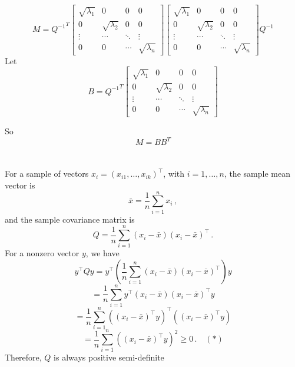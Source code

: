 \documentclass{article}
\begin{document}
\begin{itemize}
        \[
            M = {Q^{-1}}^{T}
            \begin{bmatrix}
                \sqrt{\lambda_1} & 0 & 0 & 0 \\
                0 & \sqrt{\lambda_2} & 0 & 0 \\
                \vdots & \cdots & \ddots & \vdots \\
                0 & 0 & \cdots & \sqrt{\lambda_n}
            \end{bmatrix}
            \begin{bmatrix}
                \sqrt{\lambda_1} & 0 & 0 & 0 \\
                0 & \sqrt{\lambda_2} & 0 & 0 \\
                \vdots & \cdots & \ddots & \vdots \\
                0 & 0 & \cdots & \sqrt{\lambda_n}
            \end{bmatrix}
            Q^{-1}
        \]
        Let
        \[
            B = {Q^{-1}}^{T}
            \begin{bmatrix}
                \sqrt{\lambda_1} & 0 & 0 & 0 \\
                0 & \sqrt{\lambda_2} & 0 & 0 \\
                \vdots & \cdots & \ddots & \vdots \\
                0 & 0 & \cdots & \sqrt{\lambda_n}
            \end{bmatrix}
        \]

        So
        \[
            M=BB^{T}
        \]


\end{itemize}

\section{}
For a sample of vectors $x_i=(x_{i1},\dots,x_{ik})^\top$, with $i=1,\dots,n$, the sample mean vector is
\[ \bar{x}=\frac{1}{n} \sum_{i=1}^n x_i \, , \]
and the sample covariance matrix is
\[ Q = \frac{1}{n} \sum_{i=1}^n (x_i-\bar{x})(x_i-\bar{x})^\top \, .  \]
For a nonzero vector $y$, we have
\[ y^\top Qy = y^\top\left(\frac{1}{n} \sum_{i=1}^n (x_i-\bar{x})(x_i-\bar{x})^\top\right) y \]
\[ = \frac{1}{n} \sum_{i=1}^n y^\top (x_i-\bar{x})(x_i-\bar{x})^\top y \]
\[ = \frac{1}{n} \sum_{i=1}^n ((x_i-\bar{x})^\top y)^\top ((x_i-\bar{x})^\top y) \]
\[ = \frac{1}{n} \sum_{i=1}^n \left( (x_i-\bar{x})^\top y \right)^2 \geq 0 \, . \quad (*) \]
Therefore, $Q$ is always positive semi-definite
\end{document}
